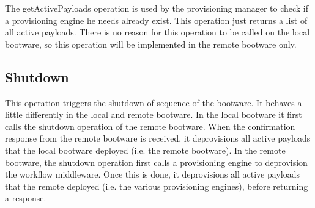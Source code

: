 The getActivePayloads operation is used by the provisioning manager to check if a provisioning engine he needs already exist.
This operation just returns a list of all active payloads.
There is no reason for this operation to be called on the local bootware, so this operation will be implemented in the remote bootware only.

\subsection{Shutdown}

This operation triggers the shutdown of sequence of the bootware.
It behaves a little differently in the local and remote bootware.
In the local bootware it first calls the shutdown operation of the remote bootware.
When the confirmation response from the remote bootware is received, it deprovisions all active payloads that the local bootware deployed (i.e. the remote bootware).
In the remote bootware, the shutdown operation first calls a provisioning engine to deprovision the workflow middleware.
Once this is done, it deprovisions all active payloads that the remote deployed (i.e. the various provisioning engines), before returning a response.
